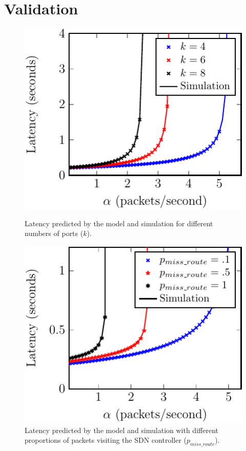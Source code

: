 
\section{Validation}
\label{sec:validation}
\begin{figure}

\centering
\begin{minipage}[b]{.49\textwidth}
	\includegraphics[width=\linewidth]{graphs/num_ports-crop}
	\caption{Latency predicted by the model and simulation for different numbers
of ports ($k$).} 
	\label{fig:num_ports}
\end{minipage}
\hfill
\begin{minipage}[b]{.49\textwidth}
	\includegraphics[width=\linewidth]{graphs/diff_sdn-crop}
	\caption{Latency predicted by the model and simulation with different
proportions of packets visiting the SDN controller ($p_{miss\_route}$).}
	\label{fig:sdn_perc}
\end{minipage}


\end{figure}
